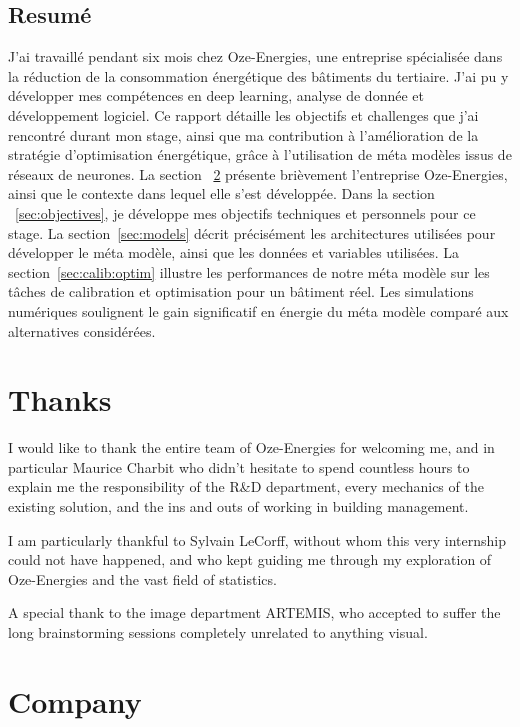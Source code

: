 \documentclass[12pt]{article}
\begin{document}
\subsection{Resumé}
J'ai travaillé pendant six mois chez Oze-Energies, une entreprise spécialisée dans la réduction de la consommation énergétique des bâtiments du tertiaire. J'ai pu y développer mes compétences en deep learning, analyse de donnée et développement logiciel. Ce rapport détaille les objectifs et challenges que j'ai rencontré durant mon stage, ainsi que ma contribution à l'amélioration de la stratégie d'optimisation énergétique, grâce à l'utilisation de méta modèles issus de réseaux de neurones. La section ~\ref{sec:company} présente brièvement l'entreprise Oze-Energies, ainsi que le contexte dans lequel elle s'est développée. Dans la section ~\ref{sec:objectives}, je développe mes objectifs techniques et personnels pour ce stage. La section~\ref{sec:models} décrit précisément les architectures utilisées pour développer le méta modèle, ainsi que les données et variables utilisées. La section~\ref{sec:calib:optim} illustre les performances de notre méta modèle sur les tâches de calibration et optimisation pour un bâtiment réel. Les simulations numériques soulignent le gain significatif en énergie du méta modèle comparé aux alternatives considérées.


\section{Thanks}
I would like to thank the entire team of Oze-Energies for welcoming me, and in particular Maurice Charbit who didn't hesitate to spend countless hours to explain me the responsibility of the R\&D department, every mechanics of the existing solution, and the ins and outs of working in building management.

I am particularly thankful to Sylvain LeCorff, without whom this very internship could not have happened, and who kept guiding me through my exploration of Oze-Energies and the vast field of statistics.

A special thank to the image department ARTEMIS, who accepted to suffer the long brainstorming sessions completely unrelated to anything visual. 

\newpage

\section{Company}
\label{sec:company}
\end{document}
